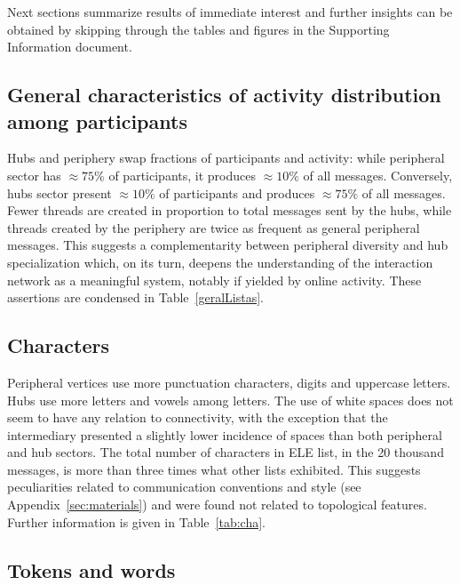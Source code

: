 \documentclass[%
 aip,
 jmp,%
 amsmath,amssymb,
 reprint,%
]{revtex4-1}
\begin{document}
Next sections summarize results of immediate interest
and further insights can be obtained by skipping through
the tables and figures in the Supporting Information document.

\subsection{General characteristics of activity distribution among participants}\label{sec:gen}

Hubs and periphery swap fractions of participants and activity:
while peripheral sector has $\approx 75\%$ of participants, it produces $\approx 10\%$ of all messages.
Conversely, hubs sector present $\approx 10\%$ of participants and produces $\approx 75\%$ of all messages.
Fewer threads are created in proportion to total messages sent by the hubs,
while threads created by the periphery are twice as frequent as general peripheral messages.
This suggests a complementarity between peripheral diversity and hub specialization
which, on its turn, deepens the understanding of the interaction network as a meaningful system, 
notably if yielded by online activity.
These assertions are condensed in Table~\ref{geralListas}.


\subsection{Characters}\label{sec:cha}

Peripheral vertices use more punctuation characters, digits and uppercase letters.
Hubs use more letters and vowels among letters.
The use of white spaces does not seem to have any relation to connectivity, with the exception that the intermediary presented a slightly lower incidence of spaces than both peripheral and hub sectors. 
The total number of characters in ELE list,
in the 20 thousand messages,
is more than three times what other lists exhibited.
This suggests peculiarities related to communication conventions and style (see Appendix~\ref{sec:materials}) and were found not related to topological features.
Further information is given in Table~\ref{tab:cha}.

\subsection{Tokens and words}\label{subsec:tw}

\end{document}
